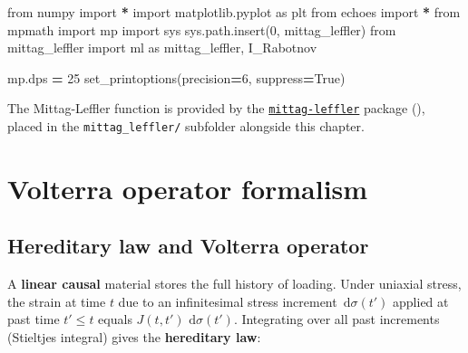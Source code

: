 \documentclass[
  a4paper,
  numbers=noendperiod,
  DIV=12]{scrreprt}
\newenvironment{Shaded}{\begin{snugshade}}{\end{snugshade}}
\newcommand{\DecValTok}[1]{\textcolor[rgb]{0.00,0.00,0.81}{#1}}
\newcommand{\ImportTok}[1]{#1}
\newcommand{\NormalTok}[1]{#1}
\newcommand{\OperatorTok}[1]{\textcolor[rgb]{0.81,0.36,0.00}{\textbf{#1}}}
\newcommand{\StringTok}[1]{\textcolor[rgb]{0.31,0.60,0.02}{#1}}
\newcommand{\VariableTok}[1]{\textcolor[rgb]{0.00,0.00,0.00}{#1}}
\newcommand{\ud}{{\,\mathrm{d}}}
\begin{document}
\begin{tcolorbox}[enhanced jigsaw, arc=.35mm, bottomrule=.15mm, bottomtitle=1mm, breakable, colback=white, colbacktitle=quarto-callout-tip-color!10!white, colframe=quarto-callout-tip-color-frame, coltitle=black, left=2mm, leftrule=.75mm, opacityback=0, opacitybacktitle=0.6, rightrule=.15mm, title={Imports}, titlerule=0mm, toprule=.15mm, toptitle=1mm]

\begin{Shaded}
\begin{Highlighting}[]
\ImportTok{from}\NormalTok{ numpy }\ImportTok{import} \OperatorTok{*}
\ImportTok{import}\NormalTok{ matplotlib.pyplot }\ImportTok{as}\NormalTok{ plt}
\ImportTok{from}\NormalTok{ echoes }\ImportTok{import} \OperatorTok{*}
\ImportTok{from}\NormalTok{ mpmath }\ImportTok{import}\NormalTok{ mp}
\ImportTok{import}\NormalTok{ sys}
\NormalTok{sys.path.insert(}\DecValTok{0}\NormalTok{, }\StringTok{\textquotesingle{}mittag\_leffler\textquotesingle{}}\NormalTok{)}
\ImportTok{from}\NormalTok{ mittag\_leffler }\ImportTok{import}\NormalTok{ ml }\ImportTok{as}\NormalTok{ mittag\_leffler, I\_Rabotnov}

\NormalTok{mp.dps }\OperatorTok{=} \DecValTok{25}
\NormalTok{set\_printoptions(precision}\OperatorTok{=}\DecValTok{6}\NormalTok{, suppress}\OperatorTok{=}\VariableTok{True}\NormalTok{)}
\end{Highlighting}
\end{Shaded}

The Mittag-Leffler function is provided by the
\href{https://github.com/khinsen/mittag-leffler}{\texttt{mittag-leffler}}
package (), placed in the
\texttt{mittag\_leffler/} subfolder alongside this chapter.

\end{tcolorbox}

\section{Volterra operator formalism}\label{sec-volterra-operator}

\subsection{Hereditary law and Volterra
operator}\label{hereditary-law-and-volterra-operator}

A \textbf{linear causal} material stores the full history of loading.
Under uniaxial stress, the strain at time \(t\) due to an infinitesimal
stress increment \(\ud\sigma(t')\) applied at past time \(t' \le t\)
equals \(J(t,t')\,\ud\sigma(t')\). Integrating over all past increments
(Stieltjes integral) gives the \textbf{hereditary law}:
\end{document}
